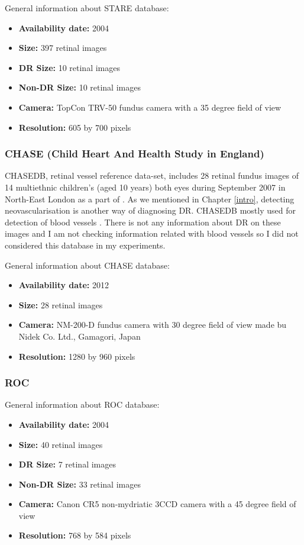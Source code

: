 General information about STARE database:

\begin{itemize}
    \item \textbf{Availability date: } 2004
    \item \textbf{Size: } 397 retinal images
    \item \textbf{DR Size: } 10 retinal images
    \item \textbf{Non-DR Size: } 10 retinal images
    \item \textbf{Camera: } TopCon TRV-50 fundus camera with a 35 degree field of view
    \item \textbf{Resolution: } 605 by 700 pixels
\end{itemize}

\subsubsection{CHASE (Child Heart And Health Study in England)}

CHASEDB, retinal vessel reference data-set, includes 28 retinal fundus images of 14 multiethnic children's (aged 10 years) both eyes during September 2007 in North-East London as a part of \citep{fraz2012ensemble}. As we mentioned in Chapter \ref{intro}, detecting neovascularisation is another way of diagnosing DR. CHASEDB mostly used for detection of blood vessels \citep{liskowski2016segmenting} \citep{elbalaoui2016automatic}. There is not any information about DR on these images and I am not checking information related with blood vessels so I did not considered this database in my experiments.

General information about CHASE database:
\begin{itemize}
    \item \textbf{Availability date: } 2012
    \item \textbf{Size: } 28 retinal images
    \item \textbf{Camera: } NM-200-D fundus camera with 30 degree field of view made bu Nidek Co. Ltd., Gamagori, Japan
    \item \textbf{Resolution: } 1280 by 960 pixels
\end{itemize}

\subsubsection{ROC}
General information about ROC database:
\begin{itemize}
    \item \textbf{Availability date: } 2004
    \item \textbf{Size: } 40 retinal images
    \item \textbf{DR Size: } 7 retinal images
    \item \textbf{Non-DR Size: } 33 retinal images
    \item \textbf{Camera: } Canon CR5 non-mydriatic 3CCD camera with a 45 degree field of view
    \item \textbf{Resolution: } 768 by 584 pixels
\end{itemize}

